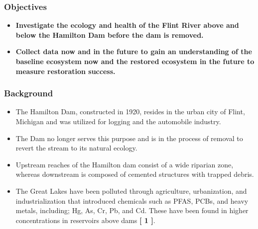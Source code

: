 \documentclass[10pt]{beamer}
\newcommand{\iast}{\item[$\circledast$]}
\begin{document}


\begin{frame}
    \frametitle{Objectives} %
    \begin{itemize}
      \iast \textbf{ \Large \hspace{5mm}
      Investigate the ecology and health of the Flint River above and below the Hamilton Dam before the dam is removed.
      } \vspace{10mm} %
      \iast \textbf{ \Large \hspace{5mm}
      Collect data now and in the future to gain an understanding of the baseline ecosystem now and the restored ecosystem in the future to measure restoration success.
      }
    \end{itemize}
\end{frame}



\begin{frame}
    \frametitle{Background} %
    \begin{itemize}
        \iast The Hamilton Dam, constructed in 1920, resides in the urban city of Flint, Michigan and was utilized for logging and the automobile industry. \vspace{2.5mm} %
        \iast The Dam no longer serves this purpose and is in the process of removal to revert the stream to its natural ecology. \vspace{2.5mm} %
        \iast Upstream reaches of the Hamilton dam consist of a wide riparian zone, whereas downstream is composed of cemented structures with trapped debris. \vspace{2.5mm} %
        \iast The Great Lakes have been polluted through agriculture, urbanization, and industrialization that introduced chemicals such as 
        PFAS, PCBs, and heavy metals, including; Hg, As, Cr, Pb, and Cd. 
        These have been found in higher concentrations in reservoirs above dams \textbf{[ 1 ]}.
    \end{itemize}
\end{frame}
\end{document}
